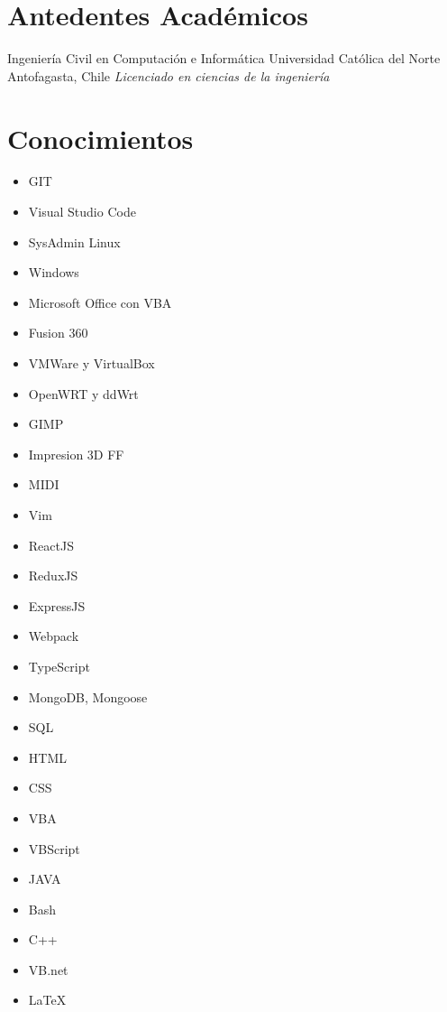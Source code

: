 \documentclass[draft,color,12pt,letterpaper,sans]{moderncv}
\begin{document}
\newpage

\section{Antedentes Acad\'emicos}
{Ingenier\'ia Civil en Computaci\'on e Inform\'atica}
{Universidad Cat\'olica del Norte}
{Antofagasta, Chile}
{\textit{Licenciado en ciencias de la ingenier\'ia}}
{}

\section{Conocimientos}
\begin{cvcolumns}
{
	\begin{itemize}
		\item
			GIT
		\item
			Visual Studio Code
		\item
			SysAdmin Linux
		\item
			Windows
		\item
			Microsoft Office con VBA
		\item
			Fusion 360
		\item
			VMWare y VirtualBox
		\item
			OpenWRT y ddWrt
		\item
			GIMP
		\item
			Impresion 3D FF
		\item
			MIDI
		\item	
			Vim
	\end{itemize}
}


{
	\begin{itemize}
		\item
			ReactJS
		\item
			ReduxJS
		\item
			ExpressJS
		\item
			Webpack
		\item
			TypeScript
		\item
			MongoDB, Mongoose
		\item
			SQL
		\item
			HTML
		\item
			CSS
		\item
			VBA
		\item	
			VBScript
		\item
			JAVA		
		\item
			Bash
		\item
			C++
		\item
			VB.net
		\item
			LaTeX
	\end{itemize}
}
\end{cvcolumns}
\end{document}
